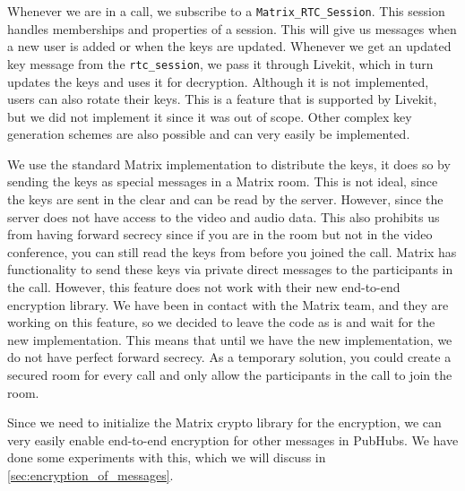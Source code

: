 \documentclass{report}
\begin{document}
Whenever we are in a call, we subscribe to a \lstinline[language=js]{Matrix_RTC_Session}. This session handles
memberships and properties of a session. This will give us messages when a new user is added or when the keys are
updated. Whenever we get an updated key message from the \lstinline[language=js]{rtc_session}, we pass it through
Livekit, which in turn updates the keys and uses it for decryption. Although it is not implemented, users can also rotate
their keys. This is a feature that is supported by Livekit, but we did not implement it since it was out of scope.
Other complex key generation schemes are also possible and can very easily be implemented.

We use the standard Matrix implementation to distribute the keys, it does so by sending the keys as special
messages in a Matrix room. This is not ideal, since the keys are sent in the clear and can be read by the server.
However, since the server does not have access to the video and audio data. This also prohibits us from having
forward secrecy since if you are in the room but not in the video conference, you can still read the keys from
before you joined the call. Matrix has functionality to send these keys via private direct messages to the
participants in the call. However, this feature does not work with their new end-to-end encryption library. We have
been in contact with the Matrix team, and they are working on this feature, so we decided to leave the code as is
and wait for the new implementation. This means that until we have the new implementation, we do not have perfect
forward secrecy. As a temporary solution, you could create a secured room for every call and only allow the
participants in the call to join the room.

Since we need to initialize the Matrix crypto library for the encryption, we can very easily enable end-to-end
encryption for other messages in PubHubs. We have done some experiments with this, which we will discuss in \autoref{sec:encryption_of_messages}.
\end{document}
